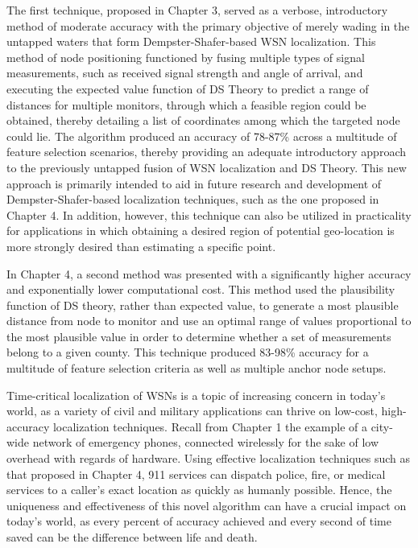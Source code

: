 \documentclass[12pt]{uthesis-v12}  %
\begin{document}
The first technique, proposed in Chapter 3, served as a verbose, introductory method of moderate accuracy with the primary objective of merely wading in the untapped waters that form Dempster-Shafer-based WSN localization. This method of node positioning functioned by fusing multiple types of signal measurements, such as received signal strength and angle of arrival, and executing the expected value function of DS Theory to predict a range of distances for multiple monitors, through which a feasible region could be obtained, thereby detailing a list of coordinates among which the targeted node could lie. The algorithm produced an accuracy of 78-87\% across a multitude of feature selection scenarios, thereby providing an adequate introductory approach to the previously untapped fusion of WSN localization and DS Theory. This new approach is primarily intended to aid in future research and development of Dempster-Shafer-based localization techniques, such as the one proposed in Chapter 4. In addition, however, this technique can also be utilized in practicality for applications in which obtaining a desired region of potential geo-location is more strongly desired than estimating a specific point.

In Chapter 4, a second method was presented with a significantly higher accuracy and exponentially lower computational cost. This method used the plausibility function of DS theory, rather than expected value, to generate a most plausible distance from node to monitor and use an optimal range of values proportional to the most plausible value in order to determine whether a set of measurements belong to a given county. This technique produced 83-98\% accuracy for a multitude of feature selection criteria as well as multiple anchor node setups. 

Time-critical localization of WSNs is a topic of increasing concern in today's world, as a variety of civil and military applications can thrive on low-cost, high-accuracy localization techniques. Recall from Chapter 1 the example of a city-wide network of emergency phones, connected wirelessly for the sake of low overhead with regards of hardware. Using effective localization techniques such as that proposed in Chapter 4, 911 services can dispatch police, fire, or medical services to a caller's exact location as quickly as humanly possible. Hence, the uniqueness and effectiveness of this novel algorithm can have a crucial impact on today's world, as every percent of accuracy achieved and every second of time saved can be the difference between life and death.
\end{document}
